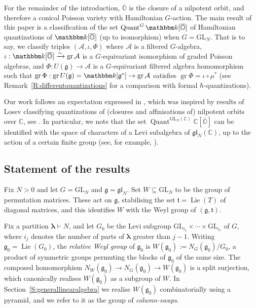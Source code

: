 \documentclass[twoside,12pt,reqno]{amsart}
\theoremstyle{remark}
\numberwithin{equation}{section}
\def\k{{\mathbbm k}}
\def\Lie{\operatorname{Lie}}
\def\gr{\operatorname{gr}}
\def\Quant{\operatorname{Quant}}
\def\blambda{{\bm{\lambda}}}
\def\C{{\mathbb C}}
\def\cO{{\overline{\mathbb O}}}
\def\GL{\mathrm{GL}}
\def\g{{\mathfrak g}}
\def\gl{\mathfrak{gl}}
\def\t{\mathfrak t}
\def\cA{\mathcal{A}}
\begin{document}
 For the remainder of the introduction, $\cO$ is the closure of a nilpotent orbit, and therefore a conical Poisson variety with Hamiltonian $G$-action. The main result of this paper is a classification of the set $\Quant^G \k[\cO]$ of Hamiltonian quantizations of $\k[\cO]$ (up to isomorphism) when $G=\GL_N$. That is to say, we classify triples $(\cA,\iota,\Phi)$ where $\cA$ is a filtered $G$-algebra, $\iota:\k[\cO]\xrightarrow{\sim} \gr\cA$ is a $G$-equivariant isomorphism of graded Poisson algebras, and $\Phi:U(\g)\to \cA$ is a $G$-equivariant filtered algebra homomorphism such that $\gr\Phi:\gr U(\g)=\k[\g^*]\to\gr\cA$ satisfies $\gr\Phi=\iota\circ\mu^*$ (see Remark~\ref{R:differentquantizations} for a comparison with formal $\hbar$-quantizations).

Our work follows an expectation expressed in \cite[Remark~5.8]{PT20}, which was inspired by results of Losev classifying quantizations of (closures and affinisations of) nilpotent orbits over $\C$, see \cite{LoQNO, LoOM, LMM}. In particular, we note that the set $\Quant^{\GL_N(\C)} \C[\cO]$ can be identified with the space of characters of a Levi subalgebra of $\gl_N(\C)$, up to the action of a certain finite group (see, for example, \cite[(7.9)]{LMM}).

\subsection{Statement of the results}
\label{ss:statementofresults}



Fix $N > 0$ and let $G = \GL_N$ and $\g = \gl_N$. Set $W \subseteq \GL_N$ to be the group of permutation matrices. These act on $\g$, stabilising the set $\t = \Lie(T)$ of diagonal matrices, and this identifies $W$ with the Weyl group of $(\g, \t)$. 

Fix a partition $\blambda \vdash N$, and let $G_0$ be the Levi subgroup $\GL_{i_1}\times\cdots\times\GL_{i_r}$ of $G$, where $i_j$ denotes the number of parts of $\blambda$ greater than $j-1$. Writing $\g_0=\Lie(G_0)$, the {\em relative Weyl group} of $\g_0$ is $W(\g_0) := N_G(\g_0)/G_0$, a product of symmetric groups permuting the blocks of $\g_0$ of the same size. The composed homomorphism $N_W(\g_0) \to N_G(\g_0) \to W(\g_0)$ is a split surjection, which canonically realises $W(\g_0)$ as a subgroup of $W$. In Section~\ref{S:generallinearalgebra} we realise $W(\g_0)$ combinatorially using a pyramid, and we refer to it as the group of {\it column-swaps}.
\end{document}

